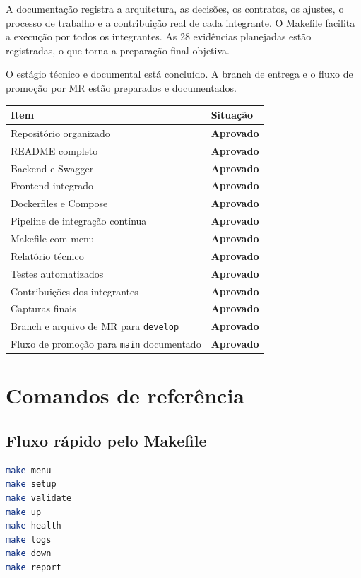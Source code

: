 \documentclass[12pt,a4paper,openany]{report}
\newcommand{\statusok}{\textcolor{OrbitGreen}{\textbf{Aprovado}}}
\begin{document}
A documentação registra a arquitetura, as decisões, os contratos, os ajustes, o processo de trabalho e a contribuição real de cada integrante. O Makefile facilita a execução por todos os integrantes. As 28 evidências planejadas estão registradas, o que torna a preparação final objetiva.

O estágio técnico e documental está concluído. A branch de entrega e o fluxo de promoção por MR estão preparados e documentados.

\begin{resumobox}
\begin{tabularx}{\textwidth}{X p{}}
\toprule
Item & Situação \\
\midrule
Repositório organizado & \statusok \\
README completo & \statusok \\
Backend e Swagger & \statusok \\
Frontend integrado & \statusok \\
Dockerfiles e Compose & \statusok \\
Pipeline de integração contínua & \statusok \\
Makefile com menu & \statusok \\
Relatório técnico & \statusok \\
Testes automatizados & \statusok \\
Contribuições dos integrantes & \statusok \\
Capturas finais & \statusok \\
Branch e arquivo de MR para \texttt{develop} & \statusok \\
Fluxo de promoção para \texttt{main} documentado & \statusok \\
\bottomrule
\end{tabularx}
\end{resumobox}

\appendix

\chapter{Comandos de referência}

\section{Fluxo rápido pelo Makefile}

\begin{lstlisting}[language=bash]
make menu
make setup
make validate
make up
make health
make logs
make down
make report
\end{lstlisting}
\end{document}
